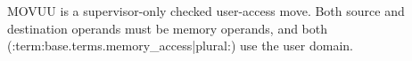 MOVUU is a supervisor-only checked user-access move. Both source and destination operands must be memory operands, and both (:term:base.terms.memory_access|plural:) use the user domain.
